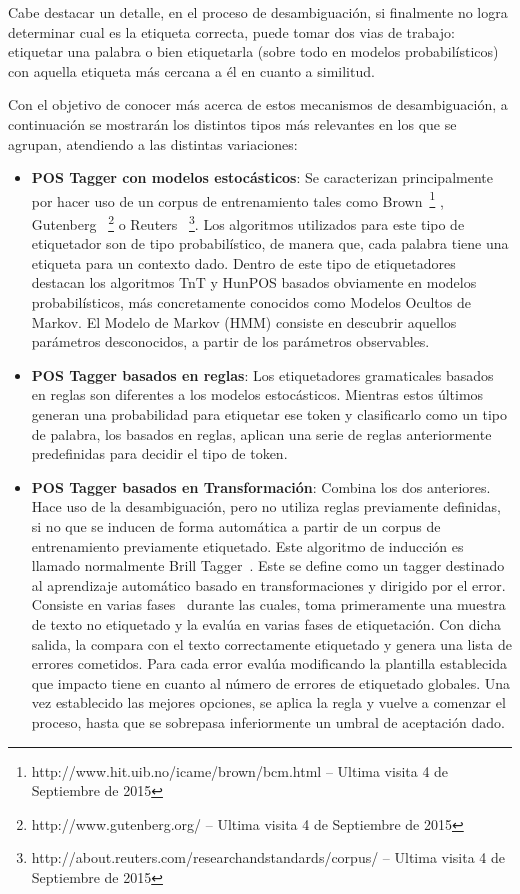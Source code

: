 \documentclass[runningheads,a4paper]{llncs}
\theoremstyle{break}
\begin{document}
Cabe destacar un detalle, en el proceso de desambiguación, si finalmente no logra determinar cual es la etiqueta correcta, puede tomar dos vias de trabajo: etiquetar una palabra o bien etiquetarla (sobre todo en modelos probabilísticos) con aquella etiqueta más cercana a él en cuanto a similitud.

Con el objetivo de conocer más acerca de estos mecanismos de desambiguación, a continuación se mostrarán los distintos tipos más relevantes en los que se agrupan, atendiendo a las distintas variaciones:

\begin{itemize}
  \item \textbf{POS Tagger con modelos estocásticos}: Se caracterizan principalmente por hacer uso de un corpus de entrenamiento tales como Brown~\footnote{http://www.hit.uib.no/icame/brown/bcm.html -- Ultima visita 4 de Septiembre de 2015} , Gutenberg ~\footnote{http://www.gutenberg.org/ -- Ultima visita 4 de Septiembre de 2015} o Reuters ~\footnote{http://about.reuters.com/researchandstandards/corpus/ -- Ultima visita 4 de Septiembre de 2015}. Los algoritmos utilizados para este tipo de etiquetador son de tipo probabilístico, de manera que, cada palabra tiene una etiqueta para un contexto dado. Dentro de este tipo de etiquetadores destacan los algoritmos TnT y HunPOS basados obviamente en modelos probabilísticos, más concretamente conocidos como Modelos Ocultos de Markov. El Modelo de Markov (HMM) consiste en descubrir aquellos parámetros desconocidos, a partir de los parámetros observables.

  \item \textbf{POS Tagger basados en reglas}: Los etiquetadores gramaticales basados en reglas son diferentes a los modelos estocásticos. Mientras estos últimos generan una probabilidad para etiquetar ese token y clasificarlo como un tipo de palabra, los basados en reglas, aplican una serie de reglas anteriormente predefinidas para decidir el tipo de token.

  \item \textbf{POS Tagger basados en Transformación}: Combina los dos anteriores. Hace uso de la desambiguación, pero no utiliza reglas previamente definidas, si no que se inducen de forma automática a partir de un corpus de entrenamiento previamente etiquetado. Este algoritmo de inducción es llamado normalmente Brill Tagger~\cite{postagger:2}. Este se define como un tagger destinado al aprendizaje automático basado en transformaciones y dirigido por el error. Consiste en varias fases~\cite{postagger:3} durante las cuales, toma primeramente una muestra de texto no etiquetado y la evalúa en varias fases de etiquetación. Con dicha salida, la compara con el texto correctamente etiquetado y genera una lista de errores cometidos. Para cada error evalúa modificando la plantilla establecida que impacto tiene en cuanto al número de errores de etiquetado globales. Una vez establecido las mejores opciones, se aplica la regla y vuelve a comenzar el proceso, hasta que se sobrepasa inferiormente un umbral de aceptación dado.

\end{itemize}
\end{document}
